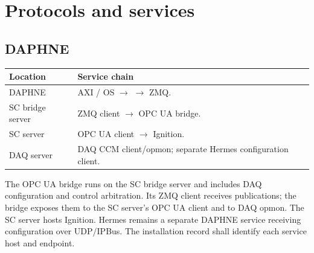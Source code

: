 \section{Protocols and services}

\subsection{DAPHNE}
\label{sec:services-daphne}

\begin{center}\small
\begin{tabular}{L{0.25\textwidth}L{0.68\textwidth}}
\toprule
\textbf{Location} & \textbf{Service chain} \\
\midrule
DAPHNE & AXI / OS $\rightarrow$  $\rightarrow$ ZMQ. \\
SC bridge server & ZMQ client $\rightarrow$ OPC UA bridge. \\
SC server & OPC UA client $\rightarrow$ Ignition. \\
DAQ server & DAQ CCM client/opmon; separate Hermes configuration client. \\
\bottomrule
\end{tabular}
\end{center}

The OPC UA bridge runs on the SC bridge server and includes DAQ configuration
and control arbitration. Its ZMQ client receives 
publications; the bridge exposes them to the SC server's OPC UA client and
to DAQ opmon. The SC server hosts Ignition. Hermes remains a separate DAPHNE
service receiving configuration over UDP/IPBus. The installation record shall
identify each service host and endpoint.

